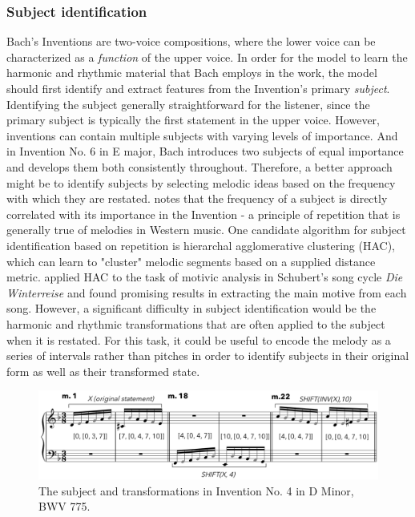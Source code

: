 \documentclass[11pt]{article}
\begin{document}
\subsubsection{Subject identification}
Bach's Inventions are two-voice compositions, where the lower voice can be characterized as a \textit{function} of the upper voice. In order for the model to learn the harmonic and rhythmic material that Bach employs in the work, the model should first identify and extract features from the Invention's primary \textit{subject}. Identifying the subject generally straightforward for the listener, since the primary subject is typically the first statement in the upper voice. However, inventions can contain multiple subjects with varying levels of importance. And in Invention No. 6 in E major, Bach introduces two subjects of equal importance and develops them both consistently throughout. Therefore, a better approach might be to identify subjects by selecting melodic ideas based on the frequency with which they are restated. \citet{dreyfus1996bach} notes that the frequency of a subject is directly correlated with its importance in the Invention - a principle of repetition that is generally true of melodies in Western music. One candidate algorithm for subject identification based on repetition is hierarchal agglomerative clustering (HAC), which can learn to "cluster" melodic segments based on a supplied distance metric. \citet{nagler2014schubot} applied HAC to the task of motivic analysis in Schubert's song cycle \textit{Die Winterreise} and found promising results in extracting the main motive from each song. However, a significant difficulty in subject identification would be the harmonic and rhythmic transformations that are often applied to the subject when it is restated. For this task, it could be useful to encode the melody as a series of intervals rather than pitches in order to identify subjects in their original form as well as their transformed state. \\

\begin{figure}[h]
\caption{ The subject and transformations in Invention No. 4 in D Minor, BWV 775.  }
\centerline{\includegraphics[scale=0.3]{examples/ex1}}
\end{figure}
\end{document}
